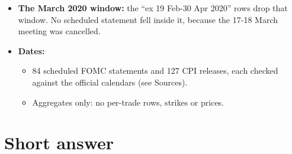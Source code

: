 \documentclass{article}
\begin{document}
\begin{itemize}
\begin{itemize}

\item book P\&L per interval, in dollars, net of costs;

\item for \texttt{hedged} 1x, P\&L per contract held at the start of the interval, since the book's size varies from 8 to 100 contracts.

\end{itemize}

\item \textbf{The March 2020 window:} the ``ex 19 Feb-30 Apr 2020'' rows drop that window. No scheduled statement fell inside it, because the 17-18 March meeting was cancelled.

\item \textbf{Dates:}

\begin{itemize}

\item 84 scheduled FOMC statements and 127 CPI releases, each checked against the official calendars (see Sources).

\item Aggregates only: no per-trade rows, strikes or prices.

\end{itemize}

\end{itemize}

\section{Short answer}
\end{document}
